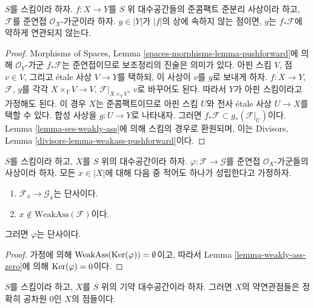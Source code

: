 \begin{lemma}
\label{lemma-weakass-pushforward}
$S$를 스킴이라 하자. $f : X \to Y$를 $S$ 위 대수공간들의
준콤팩트 준분리 사상이라 하고, $\mathcal{F}$를 준연접
$\mathcal{O}_X$-가군이라 하자. $y \in |Y|$가 $|f|$의 상에 속하지 않는
점이면, $y$는 $f_*\mathcal{F}$에 약하게 연관되지 않는다.
\end{lemma}

\begin{proof}
Morphisms of Spaces, Lemma \ref{spaces-morphisms-lemma-pushforward}에 의해
$\mathcal{O}_Y$-가군 $f_*\mathcal{F}$는 준연접이므로 보조정리의 진술은
의미가 있다. 아핀 스킴 $V$, 점 $v \in V$, 그리고 \'etale 사상
$V \to Y$를 택하되, 이 사상이 $v$를 $y$로 보내게 하자.
$f : X \to Y$, $\mathcal{F}$, $y$를 각각
$X \times_Y V \to V$, $\mathcal{F}|_{X \times_Y V}$, $v$로 바꾸어도 된다.
따라서 $Y$가 아핀 스킴이라고 가정해도 된다. 이 경우 $X$는 준콤팩트이므로
아핀 스킴 $U$와 전사 \'etale 사상 $U \to X$를 택할 수 있다.
합성 사상을 $g : U \to Y$로 나타내자.
그러면 $f_*\mathcal{F} \subset g_*(\mathcal{F}|_U)$이다.
Lemma \ref{lemma-ses-weakly-ass}에 의해 스킴의 경우로 환원되며,
이는 Divisors, Lemma \ref{divisors-lemma-weakass-pushforward}이다.
\end{proof}

\begin{lemma}
\label{lemma-check-injective-on-weakass}
$S$를 스킴이라 하고, $X$를 $S$ 위의 대수공간이라 하자.
$\varphi : \mathcal{F} \to \mathcal{G}$를 준연접
$\mathcal{O}_X$-가군들의 사상이라 하자. 모든 $x \in |X|$에 대해
다음 중 적어도 하나가 성립한다고 가정하자.
\begin{enumerate}
\item $\mathcal{F}_{\overline{x}} \to \mathcal{G}_{\overline{x}}$는
단사이다.
\item $x \not \in \text{WeakAss}(\mathcal{F})$이다.
\end{enumerate}
그러면 $\varphi$는 단사이다.
\end{lemma}

\begin{proof}
가정에 의해 $\text{WeakAss}(\mathop{\mathrm{Ker}}(\varphi)) = \emptyset$이고,
따라서 Lemma \ref{lemma-weakly-ass-zero}에 의해 $\mathop{\mathrm{Ker}}(\varphi) = 0$이다.
\end{proof}

\begin{lemma}
\label{lemma-weakass-reduced}
$S$를 스킴이라 하고, $X$를 $S$ 위의 기약 대수공간이라 하자.
그러면 $X$의 약연관점들은 정확히 공차원 $0$인 $X$의 점들이다.
\end{lemma}

